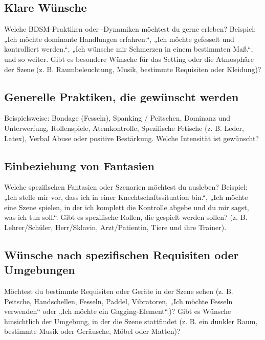 \documentclass[a4paper,12pt]{article}
\begin{document}
\newpage

\subsection{Klare Wünsche}
\noindent Welche BDSM-Praktiken oder -Dynamiken möchtest du gerne erleben? Beispiel: „Ich möchte dominante Handlungen erfahren.“, „Ich möchte gefesselt und kontrolliert werden.“, „Ich wünsche mir Schmerzen in einem bestimmten Maß.“, und so weiter. Gibt es besondere Wünsche für das Setting oder die Atmosphäre der Szene (z. B. Raumbeleuchtung, Musik, bestimmte Requisiten oder Kleidung)? \newline
\noindent \TextField[name=WuenscheKlar,multiline=true,height=20em, width=37em]{}

\subsection{Generelle Praktiken, die gewünscht werden}
\noindent Beispielsweise:  Bondage (Fesseln), Spanking / Peitschen, Dominanz und Unterwerfung, Rollenspiele, Atemkontrolle, Spezifische Fetische (z. B. Leder, Latex), Verbal Abuse oder positive Bestärkung. Welche Intensität ist gewünscht? \newline
\noindent \TextField[name=WuenschePraktiken,multiline=true,height=20em, width=37em]{}

\newpage

\subsection{Einbeziehung von Fantasien}
\noindent Welche spezifischen Fantasien oder Szenarien möchtest du ausleben? Beispiel: „Ich stelle mir vor, dass ich in einer Knechtschaftssituation bin.“, „Ich möchte eine Szene spielen, in der ich komplett die Kontrolle abgebe und du mir sagst, was ich tun soll.“. Gibt es spezifische Rollen, die gespielt werden sollen? (z. B. Lehrer/Schüler, Herr/Sklavin, Arzt/Patientin, Tiere und ihre Trainer). \newline
\noindent \TextField[name=WuenscheFantasien,multiline=true,height=20em, width=37em]{}

\subsection{Wünsche nach spezifischen Requisiten oder Umgebungen}
\noindent Möchtest du bestimmte Requisiten oder Geräte in der Szene sehen (z. B. Peitsche, Handschellen, Fesseln, Paddel, Vibratoren, „Ich möchte Fesseln verwenden“ oder „Ich möchte ein Gagging-Element“.)? Gibt es Wünsche hinsichtlich der Umgebung, in der die Szene stattfindet (z. B. ein dunkler Raum, bestimmte Musik oder Geräusche, Möbel oder Matten)? \newline
\noindent \TextField[name=WuenscheRequisiten,multiline=true,height=20em, width=37em]{}
\end{document}
